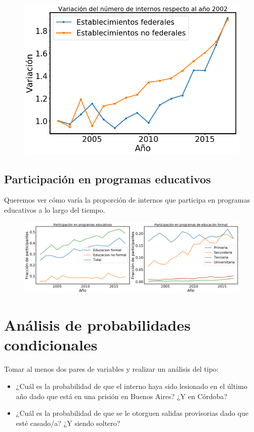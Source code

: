 \documentclass[10pt]{article}
\begin{document}
\begin{figure}[H]
	\centering
	\includegraphics[scale=0.3]{graficos/variacion.png}
	\caption{}
\end{figure}

\subsection{Participación en programas educativos}

Queremos ver cómo varía la proporción de internos que participa en programas educativos a lo largo del tiempo.

\begin{figure}[H]
	\centering
	\includegraphics[scale=0.3]{graficos/educacion.png}
	\caption{}
\end{figure}

\section{Análisis de probabilidades condicionales}
Tomar al menos dos pares de variables y realizar un análisis del tipo:

\begin{itemize}
	\item ¿Cuál es la probabilidad de que el interno haya sido lesionado en el último año dado que está en una prisión en Buenos Aires? ¿Y en Córdoba?
	\item ¿Cuál es la probabilidad de que se le otorguen salidas provisorias dado que esté casado/a? ¿Y siendo soltero?
\end{itemize}
\end{document}
